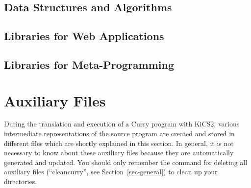 \documentclass[11pt,fleqn]{article}
\renewcommand{\tt}{\usefont{OT1}{cmtt}{m}{n}\selectfont}
\newcommand{\codefont}{\small\tt}
\newcommand{\code}[1]{\mbox{\codefont #1}}
\newcommand{\ccode}[1]{``\code{#1}''}
\begin{document}
{\subsection{Data Structures and Algorithms}












\subsection{Libraries for Web Applications}











\subsection{Libraries for Meta-Programming}













} %

\newpage



\newpage

\section{Auxiliary Files}
\label{sec-auxfiles}

During the translation and execution of a Curry program with KiCS2,
various intermediate representations of the source program are created
and stored in different files which are shortly explained in this section.
In general, it is not necessary to know about
these auxiliary files because they are automatically generated
and updated. You should only remember the command for deleting
all auxiliary files (\ccode{cleancurry}, see Section~\ref{sec-general})
to clean up your directories.
\end{document}

